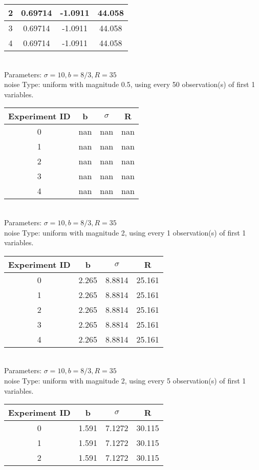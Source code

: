 \begin{multicols}{3}
\begin{tabular}{cccc}
 2 & 0.69714 & -1.0911 & 44.058\\ \hline 
 3 & 0.69714 & -1.0911 & 44.058\\ \hline 
 4 & 0.69714 & -1.0911 & 44.058\\ \hline 
 \end{tabular}\\
Parameters: $\sigma=10, b=8/3, R=35$\\
noise Type: uniform with magnitude 0.5, using every 50 observation(s) of first 1 variables.\\
\begin{tabular}{cccc}
\hline Experiment ID & b & $\sigma$ & R \\ \hline 
0 & nan & nan & nan\\ \hline 
 1 & nan & nan & nan\\ \hline 
 2 & nan & nan & nan\\ \hline 
 3 & nan & nan & nan\\ \hline 
 4 & nan & nan & nan\\ \hline 
 \end{tabular}\\
Parameters: $\sigma=10, b=8/3, R=35$\\
noise Type: uniform with magnitude 2, using every 1 observation(s) of first 1 variables.\\
\begin{tabular}{cccc}
\hline Experiment ID & b & $\sigma$ & R \\ \hline 
0 & 2.265 & 8.8814 & 25.161\\ \hline 
 1 & 2.265 & 8.8814 & 25.161\\ \hline 
 2 & 2.265 & 8.8814 & 25.161\\ \hline 
 3 & 2.265 & 8.8814 & 25.161\\ \hline 
 4 & 2.265 & 8.8814 & 25.161\\ \hline 
 \end{tabular}\\
Parameters: $\sigma=10, b=8/3, R=35$\\
noise Type: uniform with magnitude 2, using every 5 observation(s) of first 1 variables.\\
\begin{tabular}{cccc}
\hline Experiment ID & b & $\sigma$ & R \\ \hline 
0 & 1.591 & 7.1272 & 30.115\\ \hline 
 1 & 1.591 & 7.1272 & 30.115\\ \hline 
 2 & 1.591 & 7.1272 & 30.115\\ \hline 

\end{tabular}
\end{multicols}
